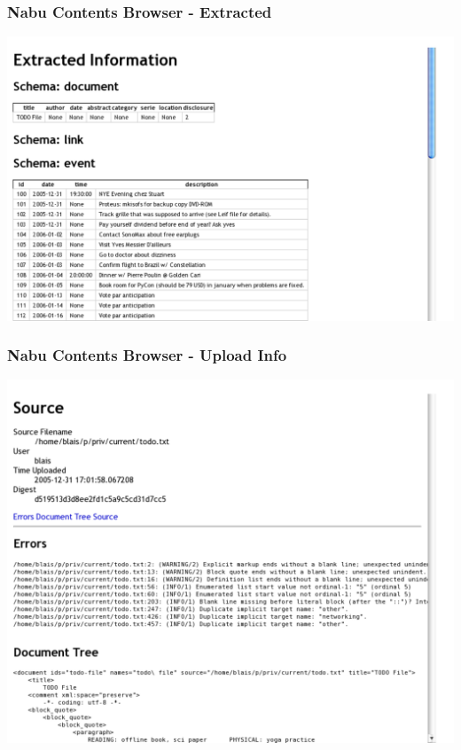 \documentclass[compress,trans]{beamer}
\begin{document}
\begin{frame}[fragile]
  \frametitle{Nabu Contents Browser - Extracted}

\includegraphics[width=1.0\textwidth]{ll-extracted.pdf}

\end{frame}


\begin{frame}[fragile]
  \frametitle{Nabu Contents Browser - Upload Info}

\includegraphics[width=1.0\textwidth]{ll-upload.pdf}

\end{frame}
\end{document}
